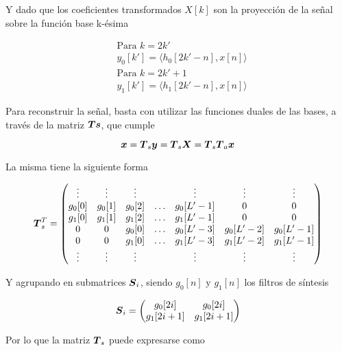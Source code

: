 Y dado que los coeficientes transformados $X[k]$ son la proyección de la señal sobre la función base k-ésima
	
	\begin{align}
		&\text{Para $k=2k'$}	\nonumber \\
		&y_0[k']=\langle h_0[2k'-n], x[n]\rangle		
	\end{align}
	\begin{align}
		&\text{Para $k=2k'+1$}	\nonumber \\
		&y_1[k']=\langle h_1[2k'-n], x[n]\rangle
	\end{align}

Para reconstruir la señal, basta con utilizar las funciones duales de las bases, a través de la matriz $\boldsymbol{Ts}$, que cumple

	\begin{equation}
		\boldsymbol{x}=\boldsymbol{T}_s\boldsymbol{y}=\boldsymbol{T}_s\boldsymbol{X}=\boldsymbol{T}_s\boldsymbol{T}_a\boldsymbol{x}
	\end{equation}

La misma tiene la siguiente forma

	\begin{equation}
		\vect{T}^T_s
		=
		\begin{pmatrix*}[c]
			\vdots & \vdots & \vdots & & \vdots & \vdots & \vdots\\
			g_0[0] & g_0[1] & g_0[2] & \hdots & g_0[L'-1] & 0 & 0 \\
			g_1[0] & g_1[1] & g_1[2] & \hdots & g_1[L'-1] & 0 & 0 \\
			0 & 0 & g_0[0] & \hdots & g_0[L'-3] & g_0[L'-2] & g_0[L'-1] \\
			0 & 0 & g_1[0] & \hdots & g_1[L'-3] & g_1[L'-2] & g_1[L'-1] \\
			\vdots & \vdots & \vdots & & \vdots & \vdots & \vdots \\
		\end{pmatrix*}	
	\end{equation}

Y agrupando en submatrices $\boldsymbol{S}_i$, siendo $g_0[n]$ y $g_1[n]$ los filtros de síntesis

	\begin{equation}
		\vect{S}_i
		=
		\begin{pmatrix*}[c]
			g_0[2i] & g_0[2i] \\
			g_1[2i+1] & g_1[2i+1] \\
		\end{pmatrix*}
	\end{equation}

Por lo que la matriz $\boldsymbol{T}_s$ puede expresarse como

